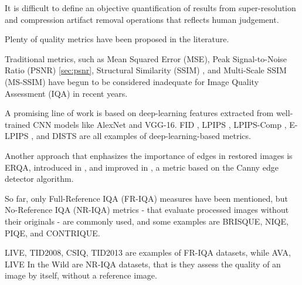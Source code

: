 
It is difficult to define an objective quantification of results from super-resolution and compression artifact removal operations that reflects human judgement.

Plenty of quality metrics have been proposed in the literature.

Traditional metrics, such as Mean Squared Error (MSE), Peak Signal-to-Noise Ratio (PSNR) \ref{sec:psnr}, Structural Similarity (SSIM) \cite{wang2004image}, and Multi-Scale SSIM (MS-SSIM) \cite{wang2003multiscale} have begun to be considered inadequate for Image Quality Assessment (IQA) in recent years.

A promising line of work is based on deep-learning features extracted from well-trained CNN models like AlexNet and VGG-16.
FID \cite{heusel2017gans}, LPIPS \cite{zhang2018unreasonable}, LPIPS-Comp \cite{patel2021saliency}, E-LPIPS \cite{kettunen2019lpips}, and DISTS \cite{ding2020image} are all examples of deep-learning-based metrics.

Another approach that enphasizes the importance of edges in restored images is ERQA, introduced in \cite{kirillova2021erqa}, and improved in \cite{lyapustin2022towards}, a metric based on the Canny edge detector algorithm.


So far, only Full-Reference IQA (FR-IQA) measures have been mentioned, but No-Reference IQA (NR-IQA) metrics - that evaluate processed images without their originals - are commonly used, and some examples are BRISQUE, NIQE, PIQE, and CONTRIQUE.


LIVE, TID2008, CSIQ, TID2013 are examples of FR-IQA datasets, while AVA, LIVE In the Wild are NR-IQA datasets, that is they assess the quality of an image by itself, without a reference image.






